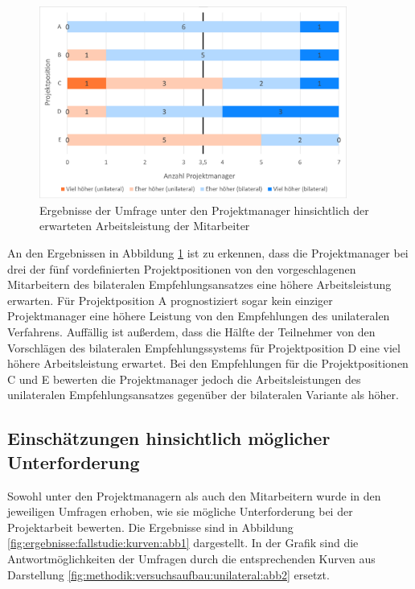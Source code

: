 \begin{figure}[h]
	\centering
	\includegraphics[width=0.9\textwidth]{gfx/ergebnisse-projektmanager-arbeitsleistung.png}	
	\caption{Ergebnisse der Umfrage unter den Projektmanager hinsichtlich der erwarteten Arbeitsleistung der Mitarbeiter}
	\label{fig:ergebnisse:fallstudie:arbeitsleistung:abb1}
\end{figure}

An den Ergebnissen in Abbildung \ref{fig:ergebnisse:fallstudie:arbeitsleistung:abb1} ist zu erkennen, dass die Projektmanager bei drei der fünf vordefinierten Projektpositionen von den vorgeschlagenen Mitarbeitern des bilateralen Empfehlungsansatzes eine höhere Arbeitsleistung erwarten. Für Projektposition A prognostiziert sogar kein einziger Projektmanager eine höhere Leistung von den Empfehlungen des unilateralen Verfahrens. Auffällig ist außerdem, dass die Hälfte der Teilnehmer von den Vorschlägen des bilateralen Empfehlungssystems für Projektposition D eine viel höhere Arbeitsleistung erwartet. Bei den Empfehlungen für die Projektpositionen C und E bewerten die Projektmanager jedoch die Arbeitsleistungen des unilateralen Empfehlungsansatzes gegenüber der bilateralen Variante als höher.

\subsection{Einschätzungen hinsichtlich möglicher Unterforderung}
\label{ch:ergebnisse:fallstudie:kurven}
Sowohl unter den Projektmanagern als auch den Mitarbeitern wurde in den jeweiligen Umfragen erhoben, wie sie mögliche Unterforderung bei der Projektarbeit bewerten. Die Ergebnisse sind in Abbildung \ref{fig:ergebnisse:fallstudie:kurven:abb1} dargestellt. In der Grafik sind die Antwortmöglichkeiten der Umfragen durch die entsprechenden Kurven aus Darstellung \ref{fig:methodik:versuchsaufbau:unilateral:abb2} ersetzt.

